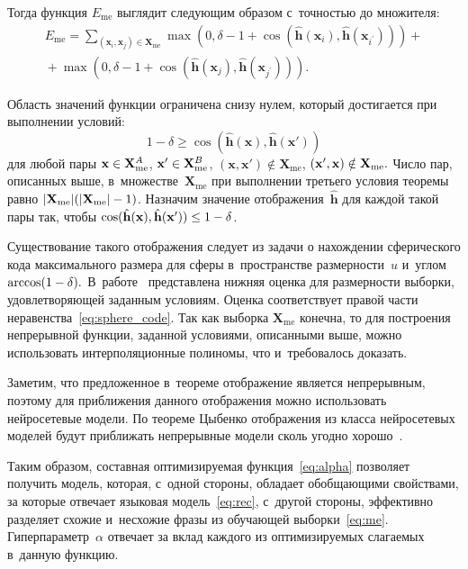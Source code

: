 \begin{multicols}{2}
Тогда функция $E_{\mathrm{me}}$ выглядит следующим образом с~точностью до множителя:
\begin{multline*}
\!E_{\mathrm{me}}= \!\!\!\!\!\sum\limits_{(\mathbf{x}_i, \mathbf{x}_j) \in \mathbf{X}_{\mathrm{me}}}
\!\!\!\!\!\!\!\!\max\left(0, \delta - 1 
+ \cos\left(\hat{\mathbf{h}}(\mathbf{x}_i), 
\hat{\mathbf{h}}\left(
\mathbf{x}_{i^{'}}\right)\!\right)\!\right) +{}\\
{}+ \max\left(0, \delta - 1  + 
\cos\left(\hat{\mathbf{h}}(\mathbf{x}_j), 
\hat{\mathbf{h}}\left(\mathbf{x}_{j^{'}}\right)\!\right)\!\right).
\end{multline*}

Область значений функции ограничена снизу нулем, который достигается при 
выполнении условий:
$$
   1 - \delta \geq  \cos \left(\hat{\mathbf{h}}(\mathbf{x}), 
\hat{\mathbf{h}}\left(\mathbf{x}'\right)\right)
$$
 для любой пары $\mathbf{x} \hm\in 
\mathbf{X}^A_{\mathrm{me}}$, $\mathbf{x}' \hm\in \mathbf{X}^B_{\mathrm{me}}$,  
$(\mathbf{x}, \mathbf{x}') \notin \mathbf{X}_{\mathrm{me}}$, $(\mathbf{x}', \mathbf{x}) \hm\notin 
\mathbf{X}_{\mathrm{me}}.$
Число пар, описанных выше, в~множестве~$\mathbf{X}_{\mathrm{me}}$ при выполнении 
третьего условия теоремы равно $|\mathbf{X}_{\mathrm{me}}|(|\mathbf{X}_{\mathrm{me}}|\hm-
1)$. Назначим значение отображения~$\hat{\mathbf{h}}$ для каждой такой пары так, 
чтобы $\cos(\hat{\mathbf{h}}(\mathbf{x}), \hat{\mathbf{h}}(\mathbf{x}'))  
\hm\leq 1 \hm- \delta$.

Существование такого отображения следует из задачи о нахождении сферического 
кода максимального размера для сферы в~пространстве размерности~$u$ и~углом 
$\arccos(1 \hm- \delta).$
В~работе~\cite{sphere_code} представлена нижняя оценка для размерности выборки, 
удовлетворяющей заданным условиям. Оценка соответствует правой части 
неравенства~\eqref{eq:sphere_code}. Так как выборка $\mathbf{X}_{\mathrm{me}}$  
конечна, то для построения непрерывной функции, заданной условиями, описанными 
выше, можно использовать интерполяционные полиномы, что и~требовалось доказать.

\smallskip


Заметим, что предложенное в~теореме отображение является непрерывным, поэтому 
для приближения данного отображения можно использовать нейросетевые модели. По 
теореме Цыбенко отображения из класса нейросетевых моделей будут приближать 
непрерывные модели сколь угодно хорошо~\cite{cybenko}.

Таким образом, составная оптимизируемая функция~\eqref{eq:alpha} позволяет 
получить модель, которая, с~одной стороны, обладает обобщающими свойствами, за 
которые отвечает языковая модель~\eqref{eq:rec}, с~другой стороны, эффективно 
разделяет схожие и~несхожие фразы из обучающей выборки~\eqref{eq:me}. 
Гиперпараметр~$\alpha$ отвечает за вклад каждого из оптимизируемых слагаемых в~данную функцию.


\end{multicols}

